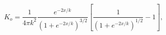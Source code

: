 \begin{equation} K_o=\frac{1}{4\pi
k^2}\frac{e^{-2x/k}}{(1+e^{-2x/k})^{3/2}}\left[
\frac{1}{(1+e^{-2x/k})^{1/2}}-1\right],
\end{equation} 
